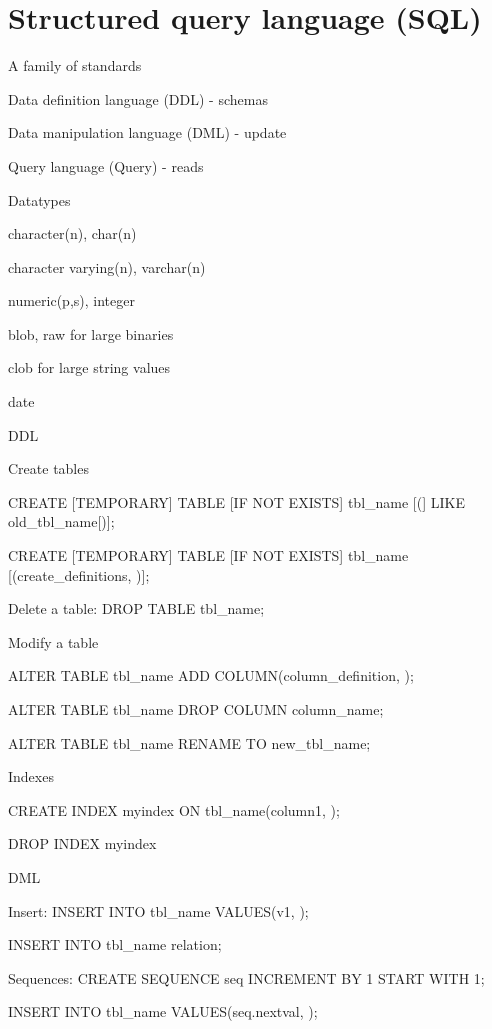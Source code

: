 \section{Structured query language (SQL)}
\enumstart
	\item A family of standards
	\enumstart
		\item Data definition language (DDL) - schemas
		\item Data manipulation language (DML) - update
		\item Query language (Query) - reads
	\enumend
	\item Datatypes
	\enumstart
		\item character(n), char(n)
		\item character varying(n), varchar(n)
		\item numeric(p,s), integer
		\item blob, raw for large binaries
		\item clob for large string values
		\item date
	\enumend
	\item DDL
	\enumstart
		\item Create tables
		\enumstart
			\item CREATE [TEMPORARY] TABLE [IF NOT EXISTS] tbl\_name [(] LIKE old\_tbl\_name[)];
			\item CREATE [TEMPORARY] TABLE [IF NOT EXISTS] tbl\_name [(create\_definitions, \ddd)];
		\enumend
		\item Delete a table: DROP TABLE tbl\_name;
		\item Modify a table
		\enumstart
			\item ALTER TABLE tbl\_name ADD COLUMN(column\_definition, \ddd);
			\item ALTER TABLE tbl\_name DROP COLUMN column\_name;
			\item ALTER TABLE tbl\_name RENAME TO new\_tbl\_name;
		\enumend
		\item Indexes
		\enumstart
			\item CREATE INDEX myindex ON tbl\_name(column1, \ddd);
			\item DROP INDEX myindex
		\enumend
	\enumend
	\item DML
	\enumstart
		\item Insert: INSERT INTO tbl\_name VALUES(v1, \ddd);
		\item INSERT INTO tbl\_name relation;
		\item Sequences: CREATE SEQUENCE seq INCREMENT BY 1 START WITH 1;
		\item INSERT INTO tbl\_name VALUES(seq.nextval, \ddd);
